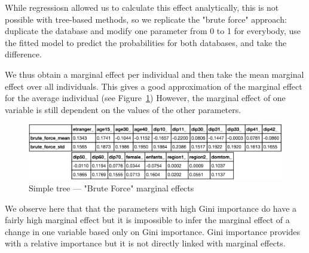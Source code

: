 While regressiosn allowed us to calculate this effect analytically, this is not possible with tree-based methods, so we replicate the "brute force" approach: duplicate the database and modify one parameter from 0 to 1 for everybody, use the fitted model to predict the probabilities for both databases, and take the difference.

We thus obtain a marginal effect per individual and then take the mean marginal effect over all individuals. This gives a good approximation of the marginal effect for the average individual (see Figure~\ref{fig:simple_tree_brute_force}) However, the marginal effect of one variable is still dependent on the values of the other parameters.

\begin{figure}
    \centering
    \includegraphics[scale=0.25]{img/simple_tree_brute_force.png}
    \caption{Simple tree --- "Brute Force" marginal effects}
    \label{fig:simple_tree_brute_force}
\end{figure}

We observe here that that the parameters with high Gini importance do have a fairly high marginal effect but it is impossible to infer the marginal effect of a change in one variable based only on Gini importance. Gini importance provides with a relative importance but it is not directly linked with marginal effects.



